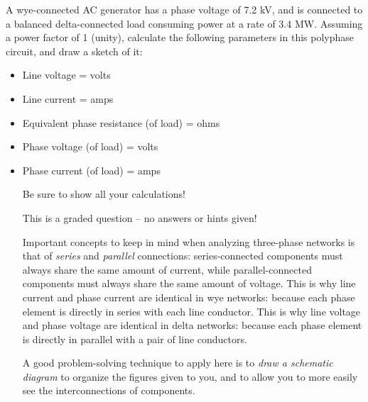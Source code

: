 

A wye-connected AC generator has a phase voltage of 7.2 kV, and is connected to a balanced delta-connected load consuming power at a rate of 3.4 MW.  Assuming a power factor of 1 (unity), calculate the following parameters in this polyphase circuit, and draw a sketch of it:

\begin{itemize}
\item{} Line voltage = \underbar{\hskip 50pt} volts
\vskip 5pt
\item{} Line current = \underbar{\hskip 50pt} amps
\vskip 5pt
\item{} Equivalent phase resistance (of load) = \underbar{\hskip 30pt} ohms
\vskip 5pt
\item{} Phase voltage (of load) = \underbar{\hskip 50pt} volts
\vskip 5pt
\item{} Phase current (of load) = \underbar{\hskip 50pt} amps
\vskip 5pt
\medskip

\noindent
Be sure to show all your calculations!

\vfil

\eject






This is a graded question -- no answers or hints given!







Important concepts to keep in mind when analyzing three-phase networks is that of {\it series} and {\it parallel} connections: series-connected components must always share the same amount of current, while parallel-connected components must always share the same amount of voltage.  This is why line current and phase current are identical in wye networks: because each phase element is directly in series with each line conductor.  This is why line voltage and phase voltage are identical in delta networks: because each phase element is directly in parallel with a pair of line conductors.

\vskip 10pt

A good problem-solving technique to apply here is to {\it draw a schematic diagram} to organize the figures given to you, and to allow you to more easily see the interconnections of components.


\end{itemize}
